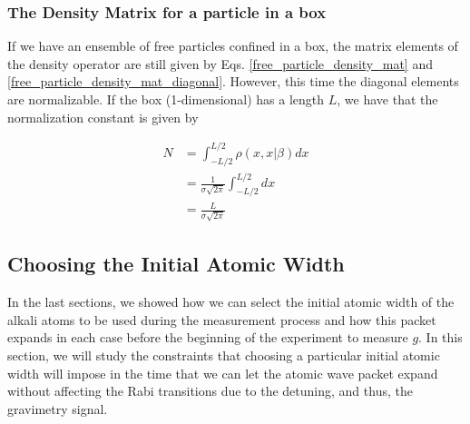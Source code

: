 \documentclass{article}
\begin{document}
\subsubsection{The Density Matrix for a particle in a box}
If we have an ensemble of free particles confined in a box, the matrix elements of the density operator are still given by Eqs. \ref{free_particle_density_mat} and \ref{free_particle_density_mat_diagonal}. However, this time the diagonal elements are normalizable. If the box (1-dimensional) has a length $L$, we have that the normalization constant is given by

\begin{equation}
   \begin{split}
        N & = \int_{-L/2}^{L/2} \rho(x, x | \beta) dx \\ & = \frac{1}{\sigma \sqrt{2\pi}} \int_{-L/2}^{L/2} dx \\ & = \frac{L}{\sigma \sqrt{2\pi}}
   \end{split}
\end{equation}

\subsection{Choosing the Initial Atomic Width}
In the last sections, we showed how we can select the initial atomic width of the alkali atoms to be used during the measurement process and how this packet expands in each case before the beginning of the experiment to measure $g$. In this section, we will study the constraints that choosing a particular initial atomic width will impose in the time that we can let the atomic wave packet expand without affecting the Rabi transitions due to the detuning, and thus, the gravimetry signal.
\end{document}
